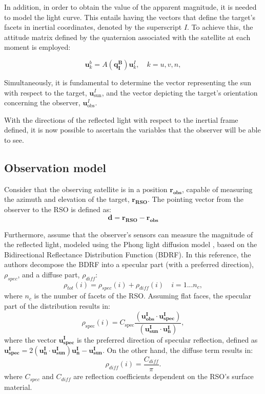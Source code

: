 In addition, in order to obtain the value of the apparent magnitude, it is needed to model the light curve. This entails having the vectors that define the target's facets in inertial coordinates, denoted by the superscript $I$. To achieve this, the attitude matrix defined by the quaternion associated with the satellite at each moment is employed:

\begin{equation}
\mathbf{u}_k^b = A(\mathbf{q_I^B})\mathbf{u}_k^I, \quad k = u, v, n,
\end{equation}

Simultaneously, it is fundamental to determine the vector representing the sun with respect to the target, $\mathbf{u}_{\text{sun}}^I$, and the vector depicting the target's orientation concerning the observer, $\mathbf{u}_{\text{obs}}^I$.

With the directions of the reflected light with respect to the inertial frame defined, it is now possible to ascertain the variables that the observer will be able to see.

\subsection{Observation model}
Consider that the observing satellite is in a position $\boldsymbol{r_{obs}}$, capable of measuring the azimuth and elevation of the target, $\boldsymbol{r_{RSO}}$. The pointing vector from the observer to the RSO is defined as:
\begin{equation}
    \boldsymbol{d}=\boldsymbol{r_{RSO}}-\boldsymbol{r_{obs}}
\end{equation}

Furthermore, assume that the observer's sensors can measure the magnitude of the reflected light, modeled using the Phong light diffusion model \cite{Phong}, based on the Bidirectional Reflectance Distribution Function (BDRF). In this reference, the authors decompose the BDRF into a specular part (with a preferred direction), $\rho_{spec}$, and a diffuse part, $\rho_{diff}$:
\begin{equation}
    \rho_{tot}(i)=\rho_{spec}(i)+\rho_{diff}(i)\quad i=1...n_c,
\end{equation}
where $n_c$ is the number of facets of the RSO. Assuming flat faces, the specular part of the distribution results in:
\begin{equation}
    \rho_{\mathrm{spec}}(i)=C_{\mathrm{spec}}\frac{(\mathbf{u_{obs}^{I}}\cdot\mathbf{u_{spec}^{I}})}{(\mathbf{u_{sun}^{I}}\cdot\mathbf{u_{n}^{I}})},
\end{equation}
where the vector $\mathbf{u_{spec}^{I}}$ is the preferred direction of specular reflection, defined as $\mathbf{u_{spec}^{I}}=2(\mathbf{u_{n}^{I}}\cdot\mathbf{u_{sun}^{I}})\mathbf{u_{n}^{I}-u_{sun}^{I}}$. On the other hand, the diffuse term results in:
\begin{equation}
    \rho_{diff}(i)=\frac{C_{diff}}{\pi}.
\end{equation}
where $C_{spec}$ and $C_{diff}$ are reflection coefficients dependent on the RSO's surface material.


